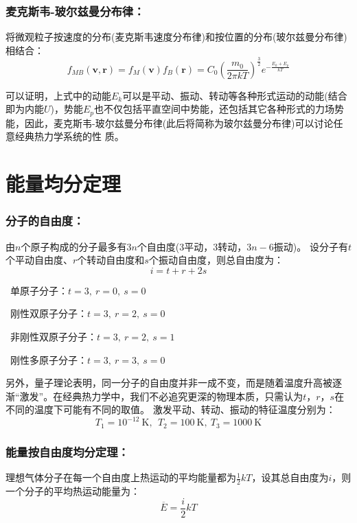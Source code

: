 \documentclass[zihao=-4,UTF8]{report}
\begin{document}
\subsubsection{麦克斯韦-玻尔兹曼分布律：}
将微观粒子按速度的分布(麦克斯韦速度分布律)和按位置的分布(玻尔兹曼分布律)相结合：
\begin{equation}
    f_{MB}(\boldsymbol{v},\boldsymbol{r} ) =f_M(\boldsymbol{v})f_B(\boldsymbol{r})= C_0\left(\frac{m_0}{2\pi kT}\right)^{\frac{3}{2}}e^{-\frac{E_k + E_p}{kT}}
\end{equation}\par
可以证明，上式中的动能$E_k$可以是平动、振动、转动等各种形式运动的动能(结合即为内能$U$)，势能$E_p$也不仅包括平直空间中势能，还包括其它各种形式的力场势能，因此，麦克斯韦-玻尔兹曼分布律(此后将简称为玻尔兹曼分布律)可以讨论任意经典热力学系统的性
质。

\section{能量均分定理}
\subsubsection{分子的自由度：}
由$n$个原子构成的分子最多有$3n$个自由度($3$平动，$3$转动，$3n-6$振动)。
设分子有$t$个平动自由度、$r$个转动自由度和$s$个振动自由度，则总自由度为：
\begin{equation}
    i = t + r + 2s
\end{equation}\par
{}\ 单原子分子：$t = 3,\ r = 0,\ s = 0$\par
{}\ 刚性双原子分子：$t = 3,\ r = 2,\ s = 0$\par
{}\ 非刚性双原子分子：$t = 3,\ r = 2,\ s = 1$\par
{}\ 刚性多原子分子：$t = 3,\ r = 3,\ s = 0$\par
另外，量子理论表明，同一分子的自由度并非一成不变，而是随着温度升高被逐渐“激发”。在经典热力学中，我们不必追究更深的物理本质，只需认为$t$，$r$，$s$在不同的温度下可能有不同的取值。
激发平动、转动、振动的特征温度分别为：
\begin{equation}
    T_1 = 10^{-12}\ \mathrm{K},\ \ T_2 = 100\ \mathrm{K},\ T_3 = 1000\ \mathrm{K}
\end{equation}
\subsubsection{能量按自由度均分定理：}
理想气体分子在每一个自由度上热运动的平均能量都为$\frac{1}{2}kT$，设其总自由度为$i$，则一个分子的平均热运动能量为：
\begin{equation}
    \overline{E} = \frac{i}{2}kT
\end{equation}
\end{document}
